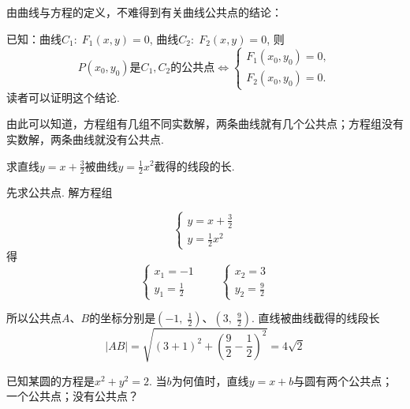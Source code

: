 由曲线与方程的定义，不难得到有关曲线公共点的结论：

已知：曲线$C_1:\; F_1(x,y)=0$, 曲线$C_2:\; F_2(x,y)=0$,
则
\[P(x_{0},y_{0})\text{是$C_1,C_{2}$的公共点}\Longleftrightarrow\begin{cases}F_{1}(x_{0},y_{0})=0,\\F_{2}(x_{0},y_{0})=0.\end{cases}\]
读者可以证明这个结论.

由此可以知道，方程组有几组不同实数解，两条曲线就有几个公共点；方程组没有实数解，两条曲线就没有公共点.

\begin{example}
求直线$y=x+\frac{3}{2}$被曲线$y=\frac{1}{2}x^2$截得的线段的长.
\end{example}

\begin{solution}
先求公共点. 解方程组    

    \noindent
\begin{minipage}{.45\textwidth}
\[\begin{cases}
    y=x+\frac{3}{2}\\
    y=\frac{1}{2}x^2
\end{cases}\]
得
\[\begin{cases}
    x_1=-1\\
    y_1=\frac{1}{2}
\end{cases}\qquad \begin{cases}
    x_2=3\\ y_2=\frac{9}{2}
\end{cases}\]    
\end{minipage}\hfill
\begin{minipage}{.45\textwidth}
\centering
{}
\end{minipage}

所以公共点$A$、$B$的坐标分别是$\left(-1,\; \frac{1}{2}\right)$、$\left(3,\; \frac{9}{2}\right)$. 直线被曲线截得的线段长
\[|AB|=\sqrt{(3+1)^2+\left(\frac{9}{2}-\frac{1}{2}\right)^2}=4\sqrt{2}\]
\end{solution}

\begin{example}
已知某圆的方程是$x^2+y^2=2$. 当$b$为何值时，直线$y=x+b$与圆有两个公共点；一个公共点；没有公共点？
\end{example}

